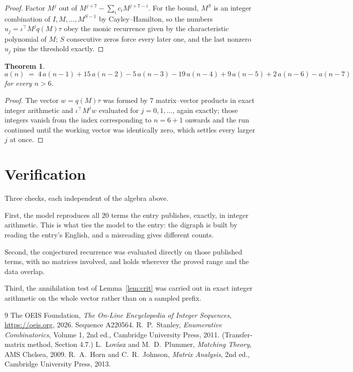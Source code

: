 \documentclass[11pt,a4paper]{article}
\theoremstyle{plain}
\newtheorem{theorem}{Theorem}
\theoremstyle{definition}
\begin{document}
\begin{proof}
Factor $M^{j}$ out of $M^{j+7}-\sum_ic_iM^{j+7-i}$. For the bound, $M^{S}$
is an integer combination of $I,M,\dots,M^{S-1}$ by Cayley--Hamilton, so the numbers
$u_j=\iota^{\!\top}M^{j}q(M)\tau$ obey the monic recurrence given by the characteristic
polynomial of $M$; $S$ consecutive zeros force every later one, and the last nonzero $u_j$
pins the threshold exactly.
\end{proof}

\begin{theorem}
\[
a(n)\;=\;4\,a(n-1) + 15\,a(n-2) - 5\,a(n-3) - 19\,a(n-4) + 9\,a(n-5) + 2\,a(n-6) - a(n-7)
\]
for every $n>6$.
\end{theorem}

\begin{proof}
The vector $w=q(M)\tau$ was formed by $7$ matrix--vector products in exact integer
arithmetic and $\iota^{\!\top}M^{j}w$ evaluated for $j=0,1,\dots$, again exactly; those
integers vanish from the index corresponding to $n=6+1$ onwards and the run continued
until the working vector was identically zero, which settles every larger $j$ at once.
\end{proof}

\section{Verification}

Three checks, each independent of the algebra above.

First, the model reproduces all $20$ terms the entry publishes, exactly, in integer
arithmetic. This is what ties the model to the entry: the digraph is built by reading the
entry's English, and a misreading gives different counts.

Second, the conjectured recurrence was evaluated directly on those published terms, with no
matrices involved, and holds wherever the proved range and the data overlap.

Third, the annihilation test of Lemma~\ref{lem:crit} was carried out in exact integer
arithmetic on the whole vector rather than on a sampled prefix.

\begin{thebibliography}{9}
 The OEIS Foundation, \emph{The On-Line Encyclopedia of Integer
Sequences}, \url{https://oeis.org}, 2026. Sequence A220564.
 R.~P.~Stanley, \emph{Enumerative Combinatorics}, Volume 1, 2nd ed.,
Cambridge University Press, 2011. (Transfer-matrix method, Section 4.7.)
 L.~Lov\'asz and M.~D.~Plummer, \emph{Matching Theory}, AMS Chelsea,
2009.
 R.~A.~Horn and C.~R.~Johnson, \emph{Matrix Analysis}, 2nd ed., Cambridge
University Press, 2013.
\end{thebibliography}
\end{document}
